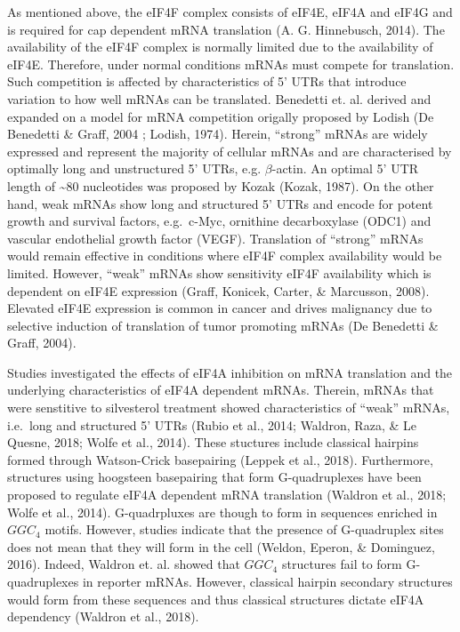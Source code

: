 \documentclass[12pt,openany]{book}
\begin{document}
As mentioned above, the eIF4F complex consists of eIF4E, eIF4A and eIF4G
and is required for cap dependent mRNA translation (A. G. Hinnebusch,
2014). The availability of the eIF4F complex is normally limited due to
the availability of eIF4E. Therefore, under normal conditions mRNAs must
compete for translation. Such competition is affected by characteristics
of 5' UTRs that introduce variation to how well mRNAs can be translated.
Benedetti et. al. derived and expanded on a model for mRNA competition
origally proposed by Lodish (De Benedetti \& Graff, 2004 ; Lodish,
1974). Herein, ``strong'' mRNAs are widely expressed and represent the
majority of cellular mRNAs and are characterised by optimally long and
unstructured 5' UTRs, e.g. \(\beta\)-actin. An optimal 5' UTR length of
\textasciitilde{}80 nucleotides was proposed by Kozak (Kozak, 1987). On
the other hand, weak mRNAs show long and structured 5' UTRs and encode
for potent growth and survival factors, e.g.~c-Myc, ornithine
decarboxylase (ODC1) and vascular endothelial growth factor (VEGF).
Translation of ``strong'' mRNAs would remain effective in conditions
where eIF4F complex availability would be limited. However, ``weak''
mRNAs show sensitivity eIF4F availability which is dependent on eIF4E
expression (Graff, Konicek, Carter, \& Marcusson, 2008). Elevated eIF4E
expression is common in cancer and drives malignancy due to selective
induction of translation of tumor promoting mRNAs (De Benedetti \&
Graff, 2004).

Studies investigated the effects of eIF4A inhibition on mRNA translation
and the underlying characteristics of eIF4A dependent mRNAs. Therein,
mRNAs that were senstitive to silvesterol treatment showed
characteristics of ``weak'' mRNAs, i.e.~long and structured 5' UTRs
(Rubio et al., 2014; Waldron, Raza, \& Le Quesne, 2018; Wolfe et al.,
2014). These stuctures include classical hairpins formed through
Watson-Crick basepairing (Leppek et al., 2018). Furthermore, structures
using hoogsteen basepairing that form G-quadruplexes have been proposed
to regulate eIF4A dependent mRNA translation (Waldron et al., 2018;
Wolfe et al., 2014). G-quadrpluxes are though to form in sequences
enriched in \(GGC_4\) motifs. However, studies indicate that the
presence of G-quadruplex sites does not mean that they will form in the
cell (Weldon, Eperon, \& Dominguez, 2016). Indeed, Waldron et. al.
showed that \(GGC_4\) structures fail to form G-quadruplexes in reporter
mRNAs. However, classical hairpin secondary structures would form from
these sequences and thus classical structures dictate eIF4A dependency
(Waldron et al., 2018).
\end{document}
